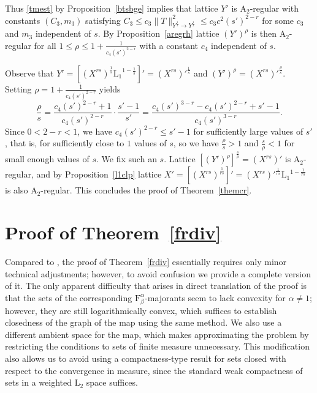 \documentclass[12pt]{amsart}
\newcommand {\apclass} [1] {\ensuremath{\mathrm A_{#1}}}
\newcommand {\frclass} [2] {\ensuremath{\mathrm F^{#1}_{#2}}}
\newcommand {\lclassg} [1] {\ensuremath{\mathrm L_{#1}}}
\begin{document}
Thus \eqref {tmest} by Proposition~\ref {btsbge} implies that lattice $Y'$ is $\apclass {2}$-regular
with constants $(C_3, m_3)$ satisfying
$C_3 \leqslant c_3 \|T\|_{Y^{\frac 1 2} \to Y^{\frac 1 2}}^2 \leqslant c_3 c^2 (s')^{2 - r}$ for some $c_3$ and $m_3$ independent
of $s$.  By Proposition~\ref {aregrh} lattice $(Y')^\rho$ is then $\apclass {2}$-regular for all
$1 \leqslant \rho \leqslant 1 + \frac 1 {c_4 (s')^{2 - r}}$ with a constant $c_4$ independent of $s$.

Observe that $Y' = \left[(X^{r s})^{\frac 1 s} \lclassg {1}^{1 - \frac 1 s}\right]' = (X^{r s})'^{\frac 1 s}$
and $(Y')^\rho = (X^{r s})'^{\frac \rho s}$.
Setting $\rho = 1 + \frac 1 {c_4 (s')^{2 - r}}$ yields
$$
\frac \rho s = \frac {c_4 (s')^{2 - r} + 1} {c_4 (s')^{2 - r}} \cdot \frac {s' - 1}  {s'} =
\frac {c_4 (s')^{3 - r} - c_4 (s')^{2 - r} + s' - 1} {c_4 (s')^{3 - r}}.
$$
Since $0 < 2 - r < 1$, we have $c_4 (s')^{2 - r} \leqslant s' - 1$ for sufficiently large values of $s'$,
that is, for sufficiently close to $1$ values of $s$, so we have $\frac \rho s > 1$ and $\frac s \rho < 1$
for small enough values of $s$.  We fix such an $s$.
Lattice $\left[(Y')^{\rho}\right]^{\frac s \rho} = (X^{r s})'$ is $\apclass {2}$-regular, and
by Proposition~\ref {l1clp} lattice
$X' = \left[\left(X^{r s}\right)^{\frac 1 {r s}}\right]' = (X^{r s})'^{\frac 1 {r s}} \lclassg {1}^{1 - \frac 1 {r s}}$
is also $\apclass {2}$-regular.  This concludes the proof of Theorem~\ref {themcr}.

\section {Proof of Theorem~\ref {frdiv}}

\label {frdivproof}

Compared to \cite [Theorem~2] {rutsky2011en},
the proof of Theorem~\ref {frdiv} essentially
requires only minor technical adjustments; however, to avoid confusion
we provide a complete version of it.  The only apparent difficulty that arises in direct translation of the proof
is that the sets of the corresponding
$\frclass {\alpha} {\beta}$-majorants seem to lack convexity for $\alpha \neq 1$;
however, they are still logarithmically convex,
which suffices to establish closedness of the graph of the map using the same method.
We also use a different ambient space for the map, which makes approximating the problem by restricting the conditions
to sets of finite measure unnecessary.
This modification also
allows us to avoid using a compactness-type result for sets closed with respect to the convergence in measure,
since the standard weak compactness of sets in a weighted $\lclassg {2}$ space suffices.
\end{document}

